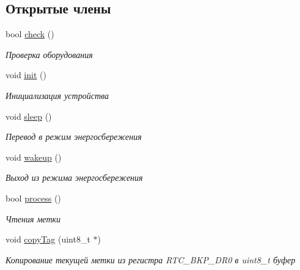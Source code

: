 \subsection*{Открытые члены}
\begin{DoxyCompactItemize}
\item 
\mbox{\label{classunit_1_1_t_tag_adc2c2801738b094045529f1373f28203}} 
bool \hyperlink{classunit_1_1_t_tag_adc2c2801738b094045529f1373f28203}{check} ()
\begin{DoxyCompactList}\small\item\em Проверка оборудования \end{DoxyCompactList}\item 
\mbox{\label{classunit_1_1_t_tag_ae3158aefc30472351d25cfba3c3f0b9f}} 
void \hyperlink{classunit_1_1_t_tag_ae3158aefc30472351d25cfba3c3f0b9f}{init} ()
\begin{DoxyCompactList}\small\item\em Инициализация устройства \end{DoxyCompactList}\item 
\mbox{\label{classunit_1_1_t_tag_acd600380312d44954f0b46ec5f704691}} 
void \hyperlink{classunit_1_1_t_tag_acd600380312d44954f0b46ec5f704691}{sleep} ()
\begin{DoxyCompactList}\small\item\em Перевод в режим энергосбережения \end{DoxyCompactList}\item 
\mbox{\label{classunit_1_1_t_tag_afc0b9080d0c67ed9fbdaa4ae3bfdfc7c}} 
void \hyperlink{classunit_1_1_t_tag_afc0b9080d0c67ed9fbdaa4ae3bfdfc7c}{wakeup} ()
\begin{DoxyCompactList}\small\item\em Выход из режима энергосбережения \end{DoxyCompactList}\item 
bool \hyperlink{classunit_1_1_t_tag_a1dfd588909730d0b48edbeda273526fe}{process} ()
\begin{DoxyCompactList}\small\item\em Чтения метки \end{DoxyCompactList}\item 
void \hyperlink{classunit_1_1_t_tag_a90fba846800afa1b828d81f079ba735e}{copy\+Tag} (uint8\+\_\+t $\ast$)
\begin{DoxyCompactList}\small\item\em Копирование текущей метки из регистра R\+T\+C\+\_\+\+B\+K\+P\+\_\+\+D\+R0 в uint8\+\_\+t буфер \end{DoxyCompactList}\end{DoxyCompactItemize}


